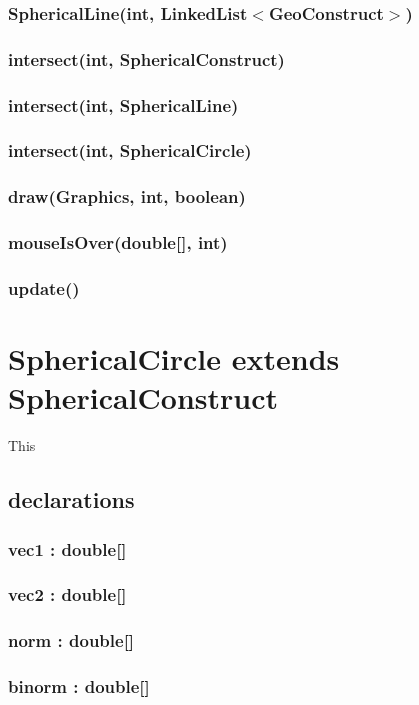 \documentclass[a4paper,10pt]{report}
\begin{document}
\subsubsection{SphericalLine(int, LinkedList$<$GeoConstruct$>$)}
\subsubsection{intersect(int, SphericalConstruct)}
\subsubsection{intersect(int, SphericalLine)}
\subsubsection{intersect(int, SphericalCircle)}
\subsubsection{draw(Graphics, int, boolean)}
\subsubsection{mouseIsOver(double[], int)}
\subsubsection{update()}
\section{SphericalCircle extends SphericalConstruct} This
\subsection{declarations}
\subsubsection{vec1 : double[]} 
\subsubsection{vec2 : double[]}
\subsubsection{norm : double[]}
\subsubsection{binorm : double[]}
\end{document}

